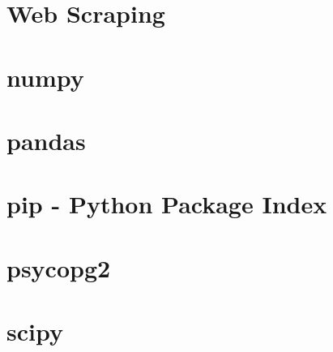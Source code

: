 \documentclass{article}
\begin{document}
%

\section{Web Scraping}


\section{numpy}


\section{pandas}


\section{pip - Python Package Index}


\section{psycopg2}

\section{scipy}

\newpage

%

\end{document}
